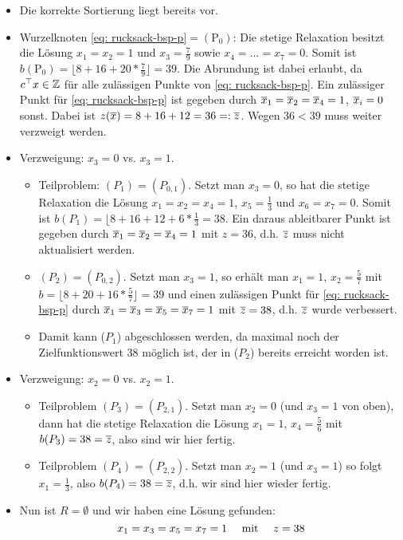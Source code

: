 \begin{beispiel}
	\begin{itemize}[leftmargin=*]
		\item Die korrekte Sortierung liegt bereits vor.
		\item Wurzelknoten \eqref{eq: rucksack-bsp-p}$=(\text{P}_0)$: Die stetige Relaxation besitzt die Lösung $x_1 = x_2 = 1$ und $x_3 = \frac{7}{9}$ sowie $x_4 = \dots = x_7 = 0$. Somit ist $b(\text{P}_0) = \lfloor 8 + 16 + 20 * \frac{7}{9} \rfloor = 39$. Die Abrundung ist dabei erlaubt, da $\trans{c} x \in \Z$ für alle zulässigen Punkte von \eqref{eq: rucksack-bsp-p}. Ein zulässiger Punkt für \eqref{eq: rucksack-bsp-p} ist gegeben durch $\quer{x}_1 = \quer{x}_2 = \quer{x}_4 = 1$, $\quer{x}_i = 0$ sonst. Dabei ist $z(\quer{x}) = 8 + 16 + 12 = 36 \defqe \quer{z}$. Wegen $36 < 39$ muss weiter verzweigt werden.
		\item Verzweigung: $x_3 = 0$ vs. $x_3 = 1$.
		\begin{itemize}
			\item Teilproblem: $(P_1) = (P_{0,1})$. Setzt man $x_3 = 0$, so hat die stetige Relaxation die Lösung $x_1 = x_2 = x_4 = 1$, $x_5 = \frac{1}{3}$ und $x_6 = x_7 = 0$. Somit ist $b(P_1) = \lfloor 8 + 16 + 12 + 6 * \frac{1}{3} = 38$. Ein daraus ableitbarer Punkt ist gegeben durch $\quer{x}_1 = \quer{x}_2 = \quer{x}_4 = 1$ mit $z = 36$, d.h. $\quer{z}$ muss nicht aktualisiert werden.
			\item $(P_2) = (P_{0,2})$. Setzt man $x_3 = 1$, so erhält man $x_1 = 1$, $x_2 = \frac{5}{7}$ mit $b = \lfloor 8 + 20 + 16 * \frac{5}{7} \rfloor = 39$ und einen zulässigen Punkt für \eqref{eq: rucksack-bsp-p} durch $\quer{x}_1 = \quer{x}_3 = \quer{x}_5 = \quer{x}_7 = 1$ mit $\quer{z} = 38$, d.h. $\quer{z}$ wurde verbessert.
			\item Damit kann ($P_1$) abgeschlossen werden, da maximal noch der Zielfunktionswert $38$ möglich ist, der in ($P_2$) bereits erreicht worden ist.
		\end{itemize}
		\item Verzweigung: $x_2 = 0$ vs. $x_2 = 1$.
		\begin{itemize}
			\item Teilproblem $(P_3) = (P_{2,1})$. Setzt man $x_2 = 0$ (und $x_3 = 1$ von oben), dann hat die stetige Relaxation die Lösung $x_1 = 1$, $x_4 = \frac{5}{6}$ mit $b(P_3) = 38 = \quer{z}$, also sind wir hier fertig.
			\item Teilproblem $(P_4) = (P_{2,2})$. Setzt man $x_2 = 1$ (und $x_3 = 1$) so folgt $x_1 = \frac{1}{3}$, also $b(P_4) = 38 = \quer{z}$, d.h. wir sind hier wieder fertig.
		\end{itemize}
		\item Nun ist $R = \emptyset$ und wir haben eine Lösung gefunden:
		\begin{equation*}
			x_1 = x_3 = x_5 = x_7 = 1 \quad \mit \quad z = 38
		\end{equation*}
	\end{itemize}
\end{beispiel}


